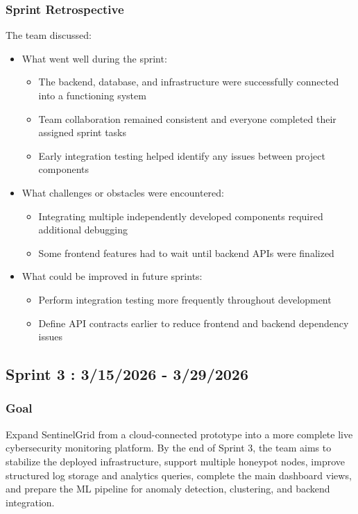 \documentclass{article}
\begin{document}
\subsubsection{Sprint Retrospective}
The team discussed:

\begin{itemize}
    \item What went well during the sprint:
    \begin{itemize}
        \item The backend, database, and infrastructure were successfully connected into a functioning system
        \item Team collaboration remained consistent and everyone completed their assigned sprint tasks
        \item Early integration testing helped identify any issues between project components
    \end{itemize}

    \item What challenges or obstacles were encountered:
    \begin{itemize}
        \item Integrating multiple independently developed components required additional debugging
        \item Some frontend features had to wait until backend APIs were finalized
    \end{itemize}

    \item What could be improved in future sprints:
    \begin{itemize}
        \item Perform integration testing more frequently throughout development
        \item Define API contracts earlier to reduce frontend and backend dependency issues
    \end{itemize}
\end{itemize}

\subsection{Sprint 3 : 3/15/2026 - 3/29/2026}
\subsubsection{Goal}
Expand SentinelGrid from a cloud-connected prototype into a more complete live cybersecurity monitoring platform. By the end of Sprint 3, the team aims to stabilize the deployed infrastructure, support multiple honeypot nodes, improve structured log storage and analytics queries, complete the main dashboard views, and prepare the ML pipeline for anomaly detection, clustering, and backend integration.
\end{document}
